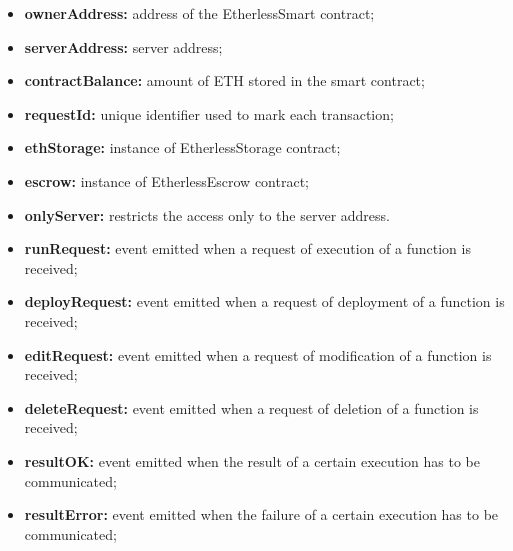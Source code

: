 	\begin{itemize}
		\item \textbf{ownerAddress:} address of the EtherlessSmart contract;
		\item \textbf{serverAddress:} server address;
		\item \textbf{contractBalance:} amount of ETH stored in the smart contract;
		\item \textbf{requestId:} unique identifier used to mark each transaction;
		\item \textbf{ethStorage:} instance of EtherlessStorage contract;
		\item \textbf{escrow:} instance of EtherlessEscrow contract;
	\end{itemize}
	\begin{itemize}
		\item \textbf{onlyServer:} restricts the access only to the server address.
	\end{itemize}
	\begin{itemize}
		\item \textbf{runRequest:} event emitted when a request of execution of a function is received;
		\item \textbf{deployRequest:} event emitted when a request of deployment of a function is received;
		\item \textbf{editRequest:} event emitted when a request of modification of a function is received;
		\item \textbf{deleteRequest:} event emitted when a request of deletion of a function is received;
		\item \textbf{resultOK:} event emitted when the result of a certain execution has to be communicated;
		\item \textbf{resultError:} event emitted when the failure of a certain execution has to be communicated;
	\end{itemize}
